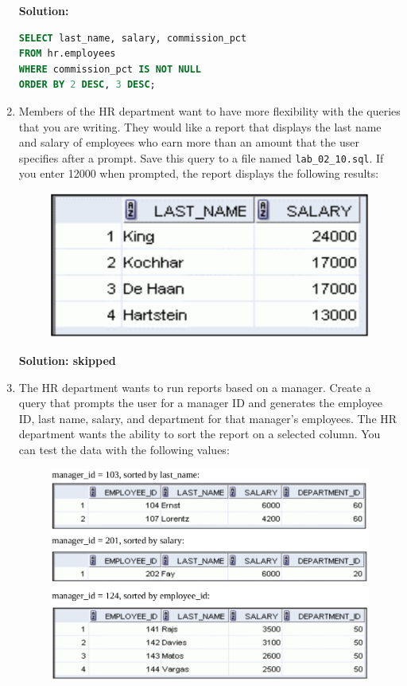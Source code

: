 \documentclass[a4paper,12pt]{article}
\begin{document}
\begin{enumerate}
    \textbf{Solution: }
    \begin{lstlisting}[language=SQL, label={lst:employees_data}]
SELECT last_name, salary, commission_pct
FROM hr.employees
WHERE commission_pct IS NOT NULL
ORDER BY 2 DESC, 3 DESC;
    \end{lstlisting}
    \newpage
    \item Members of the HR department want to have more flexibility with the queries that you are
writing. They would like a report that displays the last name and salary of employees who earn
more than an amount that the user specifies after a prompt. Save this query to a file named
\texttt{lab\_02\_10.sql}. If you enter 12000 when prompted, the report displays the following
results:
\begin{figure}[h]
    \centering
    \includegraphics*[width=0.35\linewidth]{graphics/210.png}
\end{figure}

\textbf{Solution: skipped}
    \item The HR department wants to run reports based on a manager. Create a query that prompts the
user for a manager ID and generates the employee ID, last name, salary, and department for
that manager's employees. The HR department wants the ability to sort the report on a selected
column. You can test the data with the following values:
\begin{figure}[h]
    \centering
    \includegraphics*[width=.6\linewidth]{graphics/211.png}
\end{figure}


\end{enumerate}
\end{document}
